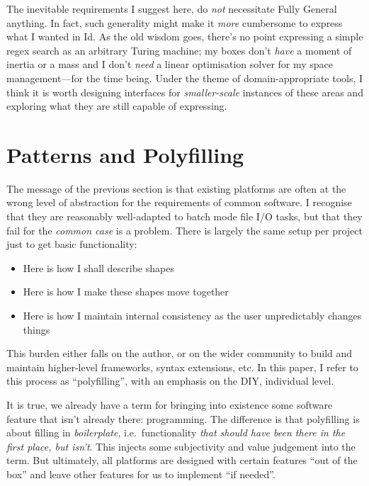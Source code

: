 The inevitable requirements I suggest here, do \emph{not} necessitate
Fully General anything. In fact, such generality might make it
\emph{more} cumbersome to express what I wanted in Id{}. As the old
wisdom goes, there's no point expressing a simple regex search as an
arbitrary Turing machine; my boxes don't \emph{have} a moment of inertia
or a mass and I don't \emph{need} a linear optimisation solver for my
space management---for the time being. Under the theme of
domain-appropriate tools, I think it is worth designing interfaces for
\emph{smaller-scale} instances of these areas and exploring what they
are still capable of expressing.

\hypertarget{patterns-and-polyfilling}{%
\section{Patterns and Polyfilling}\label{patterns-and-polyfilling}}

The message of the previous section is that existing platforms are often
at the wrong level of abstraction for the requirements of common
software. I recognise that they are reasonably well-adapted to batch
mode file I/O tasks, but that they fail for the \emph{common case} is a
problem. There is largely the same setup per project just to get basic
functionality:

\begin{itemize}
\tightlist
\item
  Here is how I shall describe shapes
\item
  Here is how I make these shapes move together
\item
  Here is how I maintain internal consistency as the user unpredictably
  changes things
\end{itemize}

This burden either falls on the author, or on the wider community to
build and maintain higher-level frameworks, syntax extensions, etc. In
this paper, I refer to this process as ``polyfilling'', with an emphasis
on the DIY, individual level.

It is true, we already have a term for bringing into existence some
software feature that isn't already there: programming. The difference
is that polyfilling is about filling in \emph{boilerplate},
i.e.~functionality \emph{that should have been there in the first place,
but isn't}. This injects some subjectivity and value judgement into the
term. But ultimately, all platforms are designed with certain features
``out of the box'' and leave other features for us to implement ``if
needed''.

